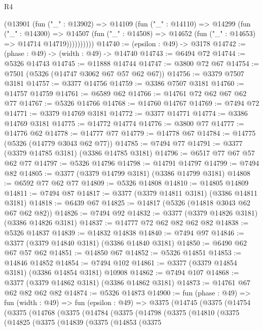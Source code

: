 \begin{lexlean}{R4}
\begin{coremodule}
            (@13901
              (fun ("_" : @13902) =>
              @14109
                (fun ("_" : @14110) =>
                @14299
                  (fun ("_" : @14300) =>
                  @14507
                    (fun ("_" : @14508) => @14652 (fun ("_" : @14653) => @14714 @14719))))))))))
@14740 := (epsilon : @49) -> @3178
@14742 := (phase : @49) -> (width : @49) -> @14740
@14743 := @6494 @72
@14744 := @5326 @14743
@14745 := @11888 @14744
@14747 := @3800 @72 @67
@14754 := @7501 (@5326 (@14747 @3062 @67 @57 @62 @67))
@14756 := @3379 @7507 @3181
@14757 := @3377 @14756
@14759 := @3386 @7507 @3181
@14760 := @14757 @14759
@14761 := @6589 @62
@14766 := @14761 @72 @62 @67 @62 @77
@14767 := @5326 @14766
@14768 := @14760 @14767
@14769 := @7494 @72
@14771 := @3379 @14769 @3181
@14772 := @3377 @14771
@14774 := @3386 @14769 @3181
@14775 := @14772 @14774
@14776 := @3800 @77
@14777 := @14776 @62
@14778 := @14777 @77
@14779 := @14778 @67
@14784 := @14775 (@5326 (@14779 @3043 @62 @77))
@14785 := @7494 @77
@14791 := @3377 (@3379 @14785 @3181) (@3386 @14785 @3181)
@14796 := @6517 @77 @67 @57 @62 @77
@14797 := @5326 @14796
@14798 := @14791 @14797
@14799 := @7494 @82
@14805 := @3377 (@3379 @14799 @3181) (@3386 @14799 @3181)
@14808 := @6592 @77 @62 @77
@14809 := @5326 @14808
@14810 := @14805 @14809
@14811 := @7494 @87
@14817 := @3377 (@3379 @14811 @3181) (@3386 @14811 @3181)
@14818 := @6439 @67
@14825 := @14817 (@5326 (@14818 @3043 @62 @67 @62 @82))
@14826 := @7494 @92
@14832 := @3377 (@3379 @14826 @3181) (@3386 @14826 @3181)
@14837 := @14777 @72 @62 @82 @62 @82
@14838 := @5326 @14837
@14839 := @14832 @14838
@14840 := @7494 @97
@14846 := @3377 (@3379 @14840 @3181) (@3386 @14840 @3181)
@14850 := @6490 @62 @67 @57 @62
@14851 := @14850 @67
@14852 := @5326 @14851
@14853 := @14846 @14852
@14854 := @7494 @102
@14861 := @3377 (@3379 @14854 @3181) (@3386 @14854 @3181) @10908
@14862 := @7494 @107
@14868 := @3377 (@3379 @14862 @3181) (@3386 @14862 @3181)
@14873 := @14761 @67 @62 @82 @62 @82
@14874 := @5326 @14873
@14900 := fun (phase : @49) =>
  fun (width : @49) =>
  fun (epsilon : @49) =>
  @3375
    (@14745
      (@3375
        (@14754
          (@3375
            (@14768
              (@3375
                (@14784
                  (@3375
                    (@14798
                      (@3375
                        (@14810
                          (@3375
                            (@14825
                              (@3375
                                (@14839
                                  (@3375
                                    (@14853
                                      (@3375

\end{coremodule}
\end{lexlean}
